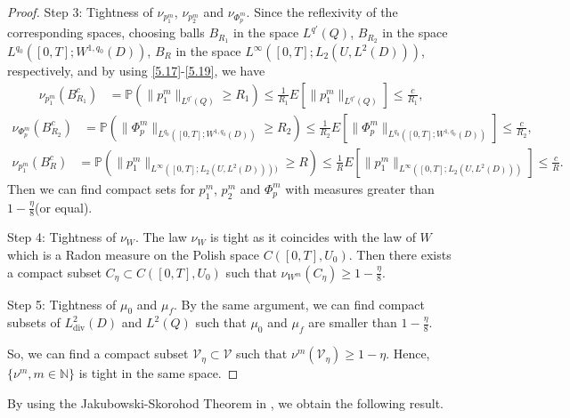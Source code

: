 \documentclass[reqno]{amsart}
\theoremstyle{definition}
\theoremstyle{remark}
\numberwithin{equation}{section} \allowdisplaybreaks
\begin{document}
\begin{proof}
{Step 3: Tightness of $\nu_{p_1^m}$, $\nu_{p_2^m}$ and
$\nu_{\Phi_p^m}$.} Since the reflexivity of the corresponding
spaces, choosing balls $B_{R_1}$ in the space $L^{q'}(Q)$, $B_{R_2}$
in the space $L^{q_0}([0,T];W^{1,q_0}(D))$, $B_{R}$ in the space
$L^{\infty}([0,T];L_2(U,L^2(D)))$, respectively, and by using
\eqref{5.17}-\eqref{5.19}, we have
\begin{equation*}
\begin{split}
\nu_{p_1^m}(B_{R_1}^c)&=\mathbb{P}(\|p_1^m\|_{L^{q'}(Q)}\geq R_1)\leq
\frac{1}{R_1}E\left[\|p_1^m\|_{L^{q'}(Q)}\right]\leq\frac{c}{R_1},
\end{split}
\end{equation*}
\begin{equation*}
\begin{split}
\nu_{\Phi_p^m}(B_{R_2}^c)&=\mathbb{P}(\|\Phi_p^m\|_{L^{q_0}([0,T];W^{1,q_0}(D))}\geq R_2)\leq
\frac{1}{R_2}E\left[\|\Phi_p^m\|_{L^{q_0}([0,T];W^{1,q_0}(D))}\right]\leq\frac{c}{R_2},
\end{split}
\end{equation*}
\begin{equation*}
\begin{split}
\nu_{p_1^m}(B_R^c)&=\mathbb{P}(\|p_1^m\|_{L^{\infty}([0,T];L_2(U,L^2(D))))}\geq R)\leq
\frac{1}{R}E\left[\|p_1^m\|_{L^{\infty}([0,T];L_2(U,L^2(D)))}\right]\leq\frac{c}{R}.
\end{split}
\end{equation*}
Then we can find compact sets for $p_1^m$, $p_2^m$ and $\Phi_p^m$
with measures greater than $1-\frac{\eta}{8}$(or equal).

{Step 4: Tightness of $\nu_W$.} The law $\nu_W$ is tight as it
coincides with the law of $W$ which is a Radon measure on the Polish
space $C([0,T],{U}_0)$. Then there exists a compact subset
$C_{\eta}\subset C([0,T],{U}_0)$ such that $\nu_{W^m}(C_\eta)\geq
1-\frac{\eta}{8}$.

{Step 5: Tightness of  $\mu_0$ and $\mu_f$.} By the same argument,
we can find compact subsets of $L^2_{\text{div}}(D)$ and $L^2(Q)$
such that $\mu_0$ and $\mu_f$ are smaller than $1-\frac{\eta}{8}$.

So, we can find a compact subset
$\mathcal{V}_\eta\subset\mathcal{V}$ such that
$\nu^m(\mathcal{V}_\eta)\geq1-\eta$. Hence,
$\{\nu^m,m\in\mathbb{N}\}$ is tight in the same space.
\end{proof}
By using the Jakubowski-Skorohod Theorem in \cite{AJ}, we obtain the
following result.
\end{document}
